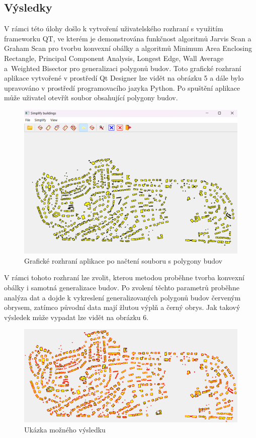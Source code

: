 \documentclass{article}
\begin{document}
\begin{spacing}{1.5}
\section{Výsledky}
V rámci této úlohy došlo k vytvoření uživatelského rozhraní s využitím frameworku QT, ve kterém je demonstrována funkčnost algoritmů Jarvis Scan a Graham Scan pro tvorbu konvexní obálky a algoritmů Minimum Area Enclosing Rectangle, Principal Component Analysis, Longest Edge, Wall Average a~Weighted Bisector pro generalizaci polygonů budov. Toto grafické rozhraní aplikace vytvořené v prostředí Qt Designer lze vidět na obrázku 5 a dále bylo upravováno v prostředí programovacího jazyka Python. Po spuštění aplikace může uživatel otevřít soubor obsahující polygony budov. 

\begin{figure}[h]
    \centering
    \includegraphics[width=0.6\linewidth]{images/rozhrani.png}
    \caption{Grafické rozhraní aplikace po načtení souboru s polygony budov}
    \label{fig:enter-label}
\end{figure}

V rámci tohoto rozhraní lze zvolit, kterou metodou proběhne tvorba konvexní obálky i samotná generalizace budov. Po zvolení těchto parametrů proběhne analýza dat a dojde k vykreslení generalizovaných polygonů budov červeným obrysem, zatímco původní data mají žlutou výplň a černý obrys. Jak takový výsledek může vypadat lze vidět na obrázku 6.

\begin{figure}[h]
    \centering
    \includegraphics[width=0.6\linewidth]{images/vysledek.png}
    \caption{Ukázka možného výsledku}
    \label{fig:enter-label}
\end{figure}


\end{spacing}
\end{document}
